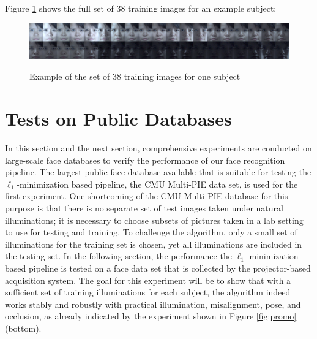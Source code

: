 Figure \ref{fig:sample_training_images} shows the full set of 38 training images 
for an example subject:
\begin{figure}[h]
\caption{\small Example of the set of 38 training images for one subject}
\centering
\includegraphics[width=\textwidth]{figures_pami/training.png}
\label{fig:sample_training_images}
\end{figure}

\section{Tests on Public Databases}\label{sec:multipie} In this section and the
next section, comprehensive experiments are conducted on large-scale face
databases to verify the performance of our face recognition pipeline.  The
largest public face database available that is suitable for testing the
$\ell_1$-minimization based pipeline, the CMU Multi-PIE data set, is used for
the first experiment.  One shortcoming of the CMU Multi-PIE database for this
purpose is that there is no separate set of test images taken under natural
illuminations; it is necessary to choose subsets of pictures taken in a lab
setting to use for testing and training.  To challenge the algorithm, only a
small set of illuminations for the training set is chosen, yet all
illuminations are included in the testing set. In the following section, the
performance the $\ell_1$-minimization based pipeline is tested on a face
data set that is collected by the projector-based acquisition system. The goal
for this experiment will be to show that with a sufficient set of training
illuminations for each subject, the algorithm indeed works stably and robustly
with practical illumination, misalignment, pose, and occlusion, as already
indicated by the experiment shown in Figure \ref{fig:promo} (bottom).

